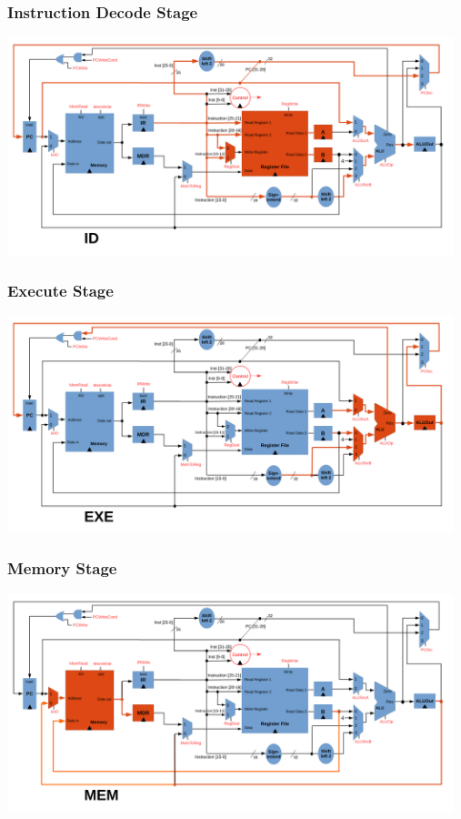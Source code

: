 \documentclass{beamer}
\begin{document}
\begin{frame}%
\frametitle{Instruction Decode Stage}

\begin{center}
\hspace*{-1cm}\includegraphics[width=13cm]{complete_multi_cycle_stage2.pdf}
\end{center}

\end{frame}

\begin{frame}%
\frametitle{Execute Stage}

\begin{center}
\hspace*{-1cm}\includegraphics[width=13cm]{complete_multi_cycle_stage3.pdf}
\end{center}

\end{frame}

\begin{frame}%
\frametitle{Memory Stage}

\begin{center}
\hspace*{-1cm}\includegraphics[width=13cm]{complete_multi_cycle_stage4.pdf}
\end{center}

\end{frame}
\end{document}
